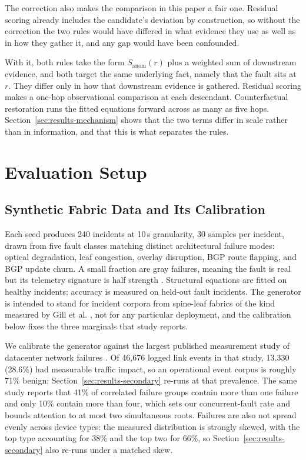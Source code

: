 \documentclass[conference]{IEEEtran}
\begin{document}
The correction also makes the comparison in this paper a fair one. Residual scoring already includes the candidate's deviation by construction, so without the correction the two rules would have differed in what evidence they use as well as in how they gather it, and any gap would have been confounded.

With it, both rules take the form $S_{\mathrm{anom}}(r)$ plus a weighted sum of downstream evidence, and both target the same underlying fact, namely that the fault sits at $r$. They differ only in how that downstream evidence is gathered. Residual scoring makes a one-hop observational comparison at each descendant. Counterfactual restoration runs the fitted equations forward across as many as five hops. Section~\ref{sec:results-mechanism} shows that the two terms differ in scale rather than in information, and that this is what separates the rules.

\section{Evaluation Setup}
\label{sec:eval-setup}

\subsection{Synthetic Fabric Data and Its Calibration}
\label{sec:realism}
Each seed produces 240 incidents at 10\,s granularity, 30 samples per incident, drawn from five fault classes matching distinct architectural failure modes: optical degradation, leaf congestion, overlay disruption, BGP route flapping, and BGP update churn. A small fraction are gray failures, meaning the fault is real but its telemetry signature is half strength \cite{huang2017gray}. Structural equations are fitted on healthy incidents; accuracy is measured on held-out fault incidents. The generator is intended to stand for incident corpora from spine-leaf fabrics of the kind measured by Gill et al. \cite{gill2011understanding}, not for any particular deployment, and the calibration below fixes the three marginals that study reports.

We calibrate the generator against the largest published measurement study of datacenter network failures \cite{gill2011understanding}. Of 46{,}676 logged link events in that study, 13{,}330 (28.6\%) had measurable traffic impact, so an operational event corpus is roughly 71\% benign; Section~\ref{sec:results-secondary} re-runs at that prevalence. The same study reports that 41\% of correlated failure groups contain more than one failure and only 10\% contain more than four, which sets our concurrent-fault rate and bounds attention to at most two simultaneous roots. Failures are also not spread evenly across device types: the measured distribution is strongly skewed, with the top type accounting for 38\% and the top two for 66\%, so Section~\ref{sec:results-secondary} also re-runs under a matched skew.
\end{document}
